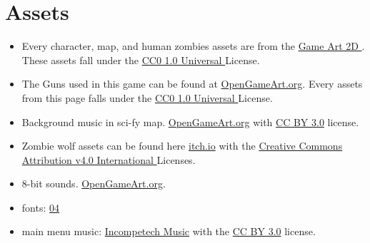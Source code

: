 \documentclass{article}
\begin{document}
\section{Assets}
\begin{itemize}
\item Every character, map, and human zombies assets are from the  \href{https://www.gameart2d.com/freebies.html}{Game Art 2D }. These assets fall under the \href{https://www.gameart2d.com/license.html}{CC0 1.0 Universal }License.

\item The Guns used in this game can be found at \href{https://opengameart.org/content/gun-construction-kit}{OpenGameArt.org}. Every assets from this page falls under the \href{https://creativecommons.org/publicdomain/zero/1.0/}{CC0 1.0 Universal }License.

\item Background music in sci-fy map. \href{https://opengameart.org/}{OpenGameArt.org} with \href{https://creativecommons.org/licenses/by/3.0/}{CC BY 3.0} license.  

\item Zombie wolf assets can be found here \href{https://ansimuz.itch.io/hell-hound-sprite-animation}{itch.io} with the  \href{https://creativecommons.org/licenses/by/4.0/}{Creative Commons Attribution v4.0 International } Licenses. 

\item 8-bit sounds. \href{https://opengameart.org/content/512-sound-effects-8-bit-style}{OpenGameArt.org}.

\item fonts: \href{http://www.04.jp.org/}{04}  

\item main menu music: \href{https://incompetech.com/music/}{Incompetech Music} with the \href{https://creativecommons.org/licenses/by/3.0/}{CC BY 3.0} license.

\end{itemize}
\end{document}

